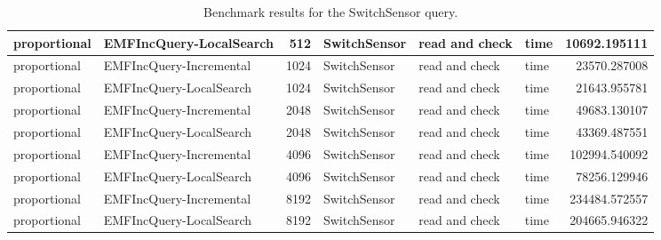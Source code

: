 \begin{table}
\begin{tabular}{| l | l | r | l | l | l | r |}
proportional & EMFIncQuery-LocalSearch & 512 & SwitchSensor & read and check & time & 10692.195111\\\hline
proportional & EMFIncQuery-Incremental & 1024 & SwitchSensor & read and check & time & 23570.287008\\\hline
proportional & EMFIncQuery-LocalSearch & 1024 & SwitchSensor & read and check & time & 21643.955781\\\hline
proportional & EMFIncQuery-Incremental & 2048 & SwitchSensor & read and check & time & 49683.130107\\\hline
proportional & EMFIncQuery-LocalSearch & 2048 & SwitchSensor & read and check & time & 43369.487551\\\hline
proportional & EMFIncQuery-Incremental & 4096 & SwitchSensor & read and check & time & 102994.540092\\\hline
proportional & EMFIncQuery-LocalSearch & 4096 & SwitchSensor & read and check & time & 78256.129946\\\hline
proportional & EMFIncQuery-Incremental & 8192 & SwitchSensor & read and check & time & 234484.572557\\\hline
proportional & EMFIncQuery-LocalSearch & 8192 & SwitchSensor & read and check & time & 204665.946322\\\hline

\end{tabular}\caption{Benchmark results for the \textsf{SwitchSensor} query.}
\label{tab:first-validation-switchsensor}
\end{table}
